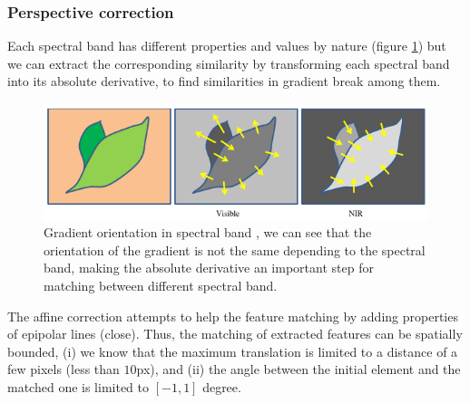 \documentclass[]{elsarticle}
\begin{document}
	\subsubsection{Perspective correction}
	
	
	Each spectral band has different properties and values by nature (figure \ref{fig:vegetable-gradient})
	but we can extract the corresponding similarity by transforming each spectral band into its absolute derivative,
	to find similarities in gradient break among them.
	
	\begin{figure}[H]
		\centering
		\includegraphics[width=0.6\linewidth]{../figures/contrast-inversion.png}
		\caption{
			Gradient orientation in spectral band \cite{rabatel:hal-01684135},
			we can see that the orientation of the gradient is not the same depending to the spectral band,
			making the absolute derivative an important step for matching between different spectral band.
		}
		\label{fig:vegetable-gradient}
	\end{figure}
	
	\par The affine correction attempts to help the feature matching by adding properties of epipolar lines (close).
	Thus, the matching of extracted features can be spatially bounded,
	(i) we know that the maximum translation is limited to a distance of a few pixels (less than $10$px),
	and (ii) the angle between the initial element and the matched one is limited to $[-1,1]$ degree.
	
\end{document}

